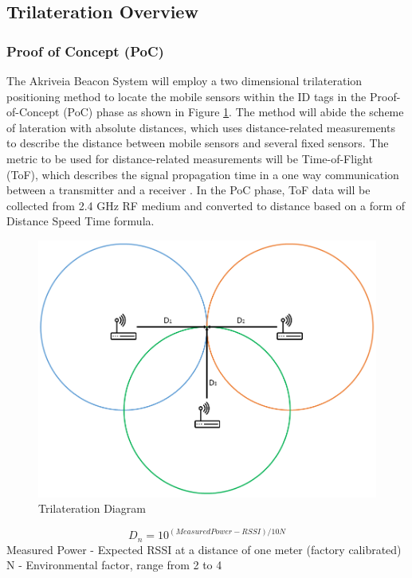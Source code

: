 \break
\subsection{Trilateration Overview}
\bigskip
\subsubsection{Proof of Concept (PoC)}
\bigskip
The Akriveia Beacon System will employ a two dimensional trilateration positioning method to locate the mobile sensors within the ID tags in the Proof-of-Concept (PoC) phase as shown in Figure \ref{Tri}. The method will abide the scheme of lateration with absolute distances, which uses distance-related measurements to describe the distance between mobile sensors and several fixed sensors. The metric to be used for distance-related measurements will be Time-of-Flight (ToF), which describes the signal propagation time in a one way communication between a transmitter and a receiver \cite{R6}. In the PoC phase, ToF data will be collected from 2.4 GHz RF medium and converted to distance based on a form of Distance Speed Time formula.

\bigskip
\begin{figure}[h!]
    \centering
    \includegraphics[width=\linewidth]{./images/Tri.png}
    \caption{Trilateration Diagram}
    \label{Tri}
\end{figure}
\bigskip

\begin{equation}
D_n = 10^{(Measured Power - RSSI)/10N}
\end{equation}
Measured Power - Expected RSSI at a distance of one meter (factory calibrated)
N - Environmental factor, range from 2 to 4


